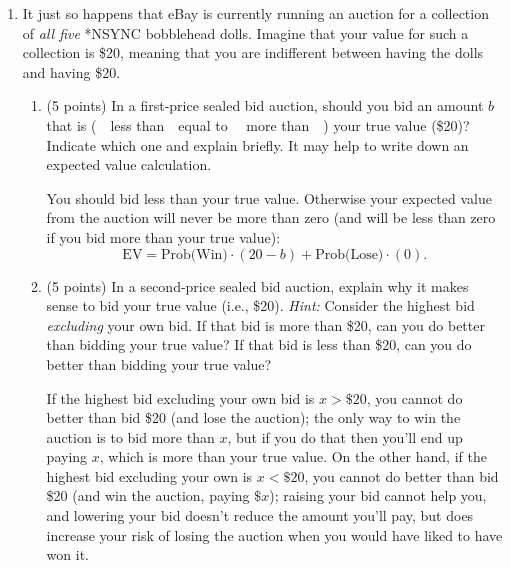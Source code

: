 \documentclass[twoside]{article}
\begin{document}
\begin{enumerate}
\begin{enumerate}
\begin{comment}
\begin{KEY}
A reasonable mechanism might be passing a law that everybody has to purchase a catalytic converter or pay a large fine.
\end{KEY}
\end{comment}
    \end{enumerate}











\item It just so happens that eBay is currently running an auction for a collection of \emph{all five} *NSYNC bobblehead dolls. Imagine that your value for such a collection is \$20, meaning that you are indifferent between having the dolls and having \$20.

    \begin{enumerate}
    \item \begin{EXAM} (5 points) In a first-price sealed bid auction, should you bid an amount $b$ that is (\ \ less than\ \ equal to \ \ more than\ \ ) your true value (\$20)? Indicate which one and explain briefly. It may help to write down an expected value calculation.  \end{EXAM}

\begin{KEY}
You should bid less than your true value. Otherwise your expected value from the auction will never be more than zero (and will be less than zero if you bid more than your true value):
\[
\mbox{EV}=\mbox{Prob(Win)}\cdot (20-b) + \mbox{Prob(Lose)}\cdot (0).
\]
\end{KEY}



    \item \begin{EXAM} (5 points) In a second-price sealed bid auction, explain why it makes sense to bid your true value (i.e., \$20). %
\emph{Hint: }Consider the highest bid \emph{excluding} your own bid. If that bid is more than \$20, can you do better than bidding your true value? If that bid is less than \$20, can you do better than bidding your true value? \end{EXAM}

\begin{KEY}
If the highest bid excluding your own bid is $x>\$20$, you cannot do better than bid \$20 (and lose the auction); the only way to win the auction is to bid more than $x$, but if you do that then you'll end up paying $x$, which is more than your true value. On the other hand, if the highest bid excluding your own is $x<\$20$, you cannot do better than bid \$20 (and win the auction, paying $\$x$); raising your bid cannot help you, and lowering your bid doesn't reduce the amount you'll pay, but does increase your risk of losing the auction when you would have liked to have won it.
\end{KEY}





\end{enumerate}
\end{enumerate}
\end{document}
